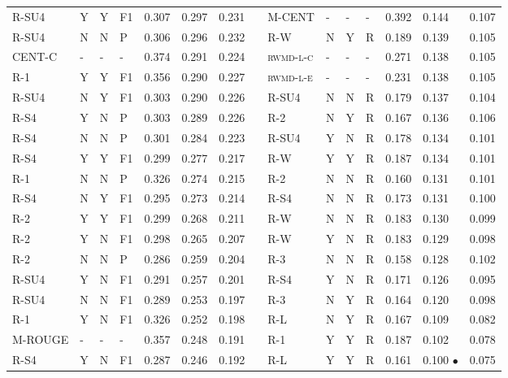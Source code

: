 \documentclass[11pt,a4paper]{article}
\begin{document}
\begin{table}[]
{\begin{tabular}{lllllllllllllll}
\textsc{R-SU4} & Y & Y & F1 & 0.307 & 0.297 & 0.231 &  & \textsc{M-CENT} & - & - & - & 0.392 & 0.144 & 0.107 \\
\textsc{R-SU4} & N & N & P & 0.306 & 0.296 & 0.232 &  & \textsc{R-W} & N & Y & R & 0.189 & 0.139 & 0.105 \\
\textsc{CENT-C} & - & - & - & 0.374 & 0.291 & 0.224 &  & \textsc{rwmd-l-c} & - & - & - & 0.271 & 0.138 & 0.105 \\
\textsc{R-1} & Y & Y & F1 & 0.356 & 0.290 & 0.227 &  & \textsc{rwmd-l-e} & - & - & - & 0.231 & 0.138 & 0.105 \\
\textsc{R-SU4} & N & Y & F1 & 0.303 & 0.290 & 0.226 &  & \textsc{R-SU4} & N & N & R & 0.179 & 0.137 & 0.104 \\
\textsc{R-S4} & Y & N & P & 0.303 & 0.289 & 0.226 &  & \textsc{R-2} & N & Y & R & 0.167 & 0.136 & 0.106 \\
\textsc{R-S4} & N & N & P & 0.301 & 0.284 & 0.223 &  & \textsc{R-SU4} & Y & N & R & 0.178 & 0.134 & 0.101 \\
\textsc{R-S4} & Y & Y & F1 & 0.299 & 0.277 & 0.217 &  & \textsc{R-W} & Y & Y & R & 0.187 & 0.134 & 0.101 \\
\textsc{R-1} & N & N & P & 0.326 & 0.274 & 0.215 &  & \textsc{R-2} & N & N & R & 0.160 & 0.131 & 0.101 \\
\textsc{R-S4} & N & Y & F1 & 0.295 & 0.273 & 0.214 &  & \textsc{R-S4} & N & N & R & 0.173 & 0.131 & 0.100 \\
\textsc{R-2} & Y & Y & F1 & 0.299 & 0.268 & 0.211 &  & \textsc{R-W} & N & N & R & 0.183 & 0.130 & 0.099 \\
\textsc{R-2} & Y & N & F1 & 0.298 & 0.265 & 0.207 &  & \textsc{R-W} & Y & N & R & 0.183 & 0.129 & 0.098 \\
\textsc{R-2} & N & N & P & 0.286 & 0.259 & 0.204 &  & \textsc{R-3} & N & N & R & 0.158 & 0.128 & 0.102 \\
\textsc{R-SU4} & Y & N & F1 & 0.291 & 0.257 & 0.201 &  & \textsc{R-S4} & Y & N & R & 0.171 & 0.126 & 0.095 \\
\textsc{R-SU4} & N & N & F1 & 0.289 & 0.253 & 0.197 &  & \textsc{R-3} & N & Y & R & 0.164 & 0.120 & 0.098 \\
\textsc{R-1} & Y & N & F1 & 0.326 & 0.252 & 0.198 &  & \textsc{R-L} & N & Y & R & 0.167 & 0.109 & 0.082 \\
\textsc{M-ROUGE} & - & - & - & 0.357 & 0.248 & 0.191 &  & \textsc{R-1} & Y & Y & R & 0.187 & 0.102 & 0.078 \\
\textsc{R-S4} & Y & N & F1 & 0.287 & 0.246 & 0.192 &  & \textsc{R-L} & Y & Y & R & 0.161 & 0.100 $\bullet$ & 0.075 \\

\end{tabular}}
\end{table}
\end{document}

